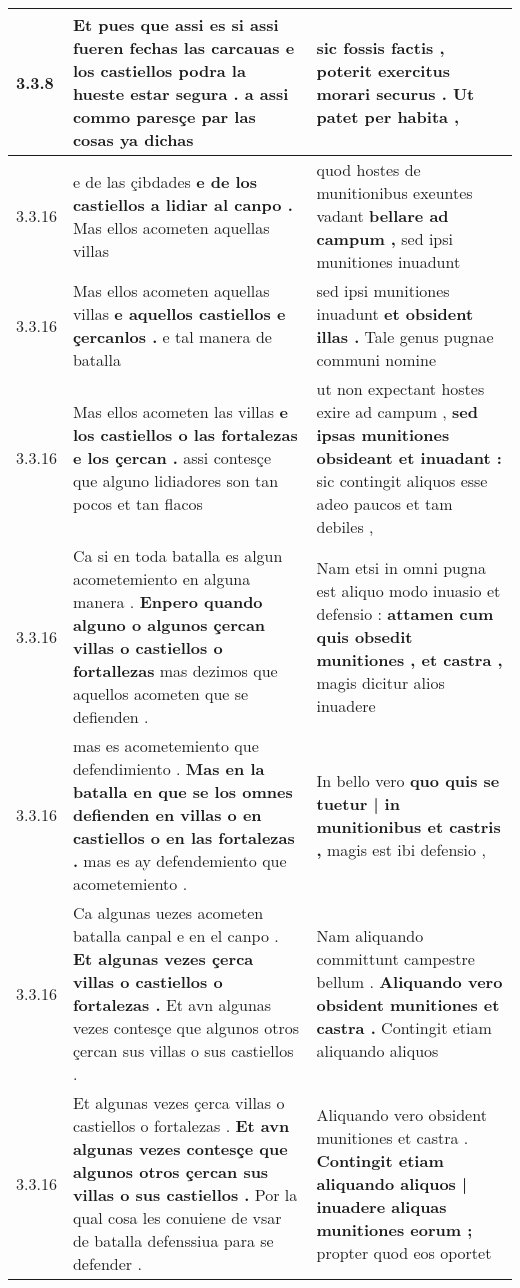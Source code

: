 \begin{tabular}{|p{1cm}|p{6.5cm}|p{6.5cm}|}
3.3.8 & Et pues que assi es si assi fueren fechas las carcauas \textbf{ e los castiellos podra la hueste estar segura . } a assi commo paresçe par las cosas ya dichas & sic fossis factis , \textbf{ poterit exercitus morari securus . } Ut patet per habita , \\\hline
3.3.16 & e de las çibdades \textbf{ e de los castiellos a lidiar al canpo . } Mas ellos acometen aquellas villas & quod hostes de munitionibus exeuntes vadant \textbf{ bellare ad campum , } sed ipsi munitiones inuadunt \\\hline
3.3.16 & Mas ellos acometen aquellas villas \textbf{ e aquellos castiellos e çercanlos . } e tal manera de batalla & sed ipsi munitiones inuadunt \textbf{ et obsident illas . } Tale genus pugnae communi nomine \\\hline
3.3.16 & Mas ellos acometen las villas \textbf{ e los castiellos o las fortalezas e los çercan . } assi contesçe que alguno lidiadores son tan pocos et tan flacos & ut non expectant hostes exire ad campum , \textbf{ sed ipsas munitiones obsideant et inuadant : } sic contingit aliquos esse adeo paucos et tam debiles , \\\hline
3.3.16 & Ca si en toda batalla es algun acometemiento en alguna manera . \textbf{ Enpero quando alguno o algunos çercan villas o castiellos o fortallezas } mas dezimos que aquellos acometen que se defienden . & Nam etsi in omni pugna est aliquo modo inuasio et defensio : \textbf{ attamen cum quis obsedit munitiones , et castra , } magis dicitur alios inuadere \\\hline
3.3.16 & mas es acometemiento que defendimiento . \textbf{ Mas en la batalla en que se los omnes defienden en villas o en castiellos o en las fortalezas . } mas es ay defendemiento que acometemiento . & In bello vero \textbf{ quo quis se tuetur | in munitionibus et castris , } magis est ibi defensio , \\\hline
3.3.16 & Ca algunas uezes acometen batalla canpal e en el canpo . \textbf{ Et algunas vezes çerca villas o castiellos o fortalezas . } Et avn algunas vezes contesçe que algunos otros çercan sus villas o sus castiellos . & Nam aliquando committunt campestre bellum . \textbf{ Aliquando vero obsident munitiones et castra . } Contingit etiam aliquando aliquos \\\hline
3.3.16 & Et algunas vezes çerca villas o castiellos o fortalezas . \textbf{ Et avn algunas vezes contesçe que algunos otros çercan sus villas o sus castiellos . } Por la qual cosa les conuiene de vsar de batalla defenssiua para se defender . & Aliquando vero obsident munitiones et castra . \textbf{ Contingit etiam aliquando aliquos | inuadere aliquas munitiones eorum ; } propter quod eos oportet \\\hline

\end{tabular}

